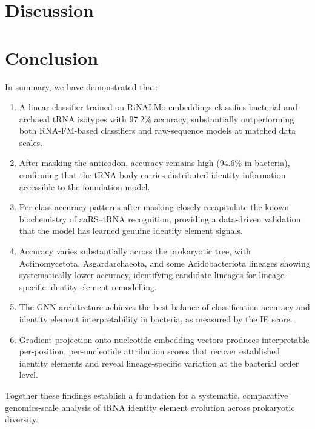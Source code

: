 \documentclass{article}
\begin{document}
\section{Discussion}


\section{Conclusion}

In summary, we have demonstrated that:
\begin{enumerate}
    \item A linear classifier trained on RiNALMo embeddings classifies bacterial and archaeal tRNA isotypes with 97.2\% accuracy, substantially outperforming both RNA-FM-based classifiers and raw-sequence models at matched data scales.
    \item After masking the anticodon, accuracy remains high (94.6\% in bacteria), confirming that the tRNA body carries distributed identity information accessible to the foundation model.
    \item Per-class accuracy patterns after masking closely recapitulate the known biochemistry of aaRS–tRNA recognition, providing a data-driven validation that the model has learned genuine identity element signals.
    \item Accuracy varies substantially across the prokaryotic tree, with Actinomycetota, Asgardarchaeota, and some Acidobacteriota lineages showing systematically lower accuracy, identifying candidate lineages for lineage-specific identity element remodelling.
    \item The GNN architecture achieves the best balance of classification accuracy and identity element interpretability in bacteria, as measured by the IE score.
    \item Gradient projection onto nucleotide embedding vectors produces interpretable per-position, per-nucleotide attribution scores that recover established identity elements and reveal lineage-specific variation at the bacterial order level.
\end{enumerate}
Together these findings establish a foundation for a systematic, comparative genomics-scale analysis of tRNA identity element evolution across prokaryotic diversity.
\end{document}
